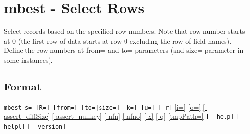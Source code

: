 
%

\section{mbest - Select Rows \label{sect:mbest}}
Select records based on the specified row numbers.  Note that row number starts at 0 (the first row of data starts at row 0 excluding the row of field names). Define the row numbers at from= and to= parameters (and size= parameter in some instances).   

\subsection*{Format}
\verb/mbest s= [R=] [from=] [to=|size=] [k=] [u=] [-r]/
\hyperref[sect:option_i]{[i=]}
\hyperref[sect:option_o]{[o=]}
\hyperref[sect:option_assert_diffSize]{[-assert\_diffSize]}
\hyperref[sect:option_assert_nullkey]{[-assert\_nullkey]}
\hyperref[sect:option_nfn]{[-nfn]} 
\hyperref[sect:option_nfno]{[-nfno]}  
\hyperref[sect:option_x]{[-x]}
\hyperref[sect:option_q]{[-q]}
\hyperref[sect:option_option_tmppath]{[tmpPath=]}
\verb|[--help]|
\verb|[--helpl]|
\verb|[--version]|\\

